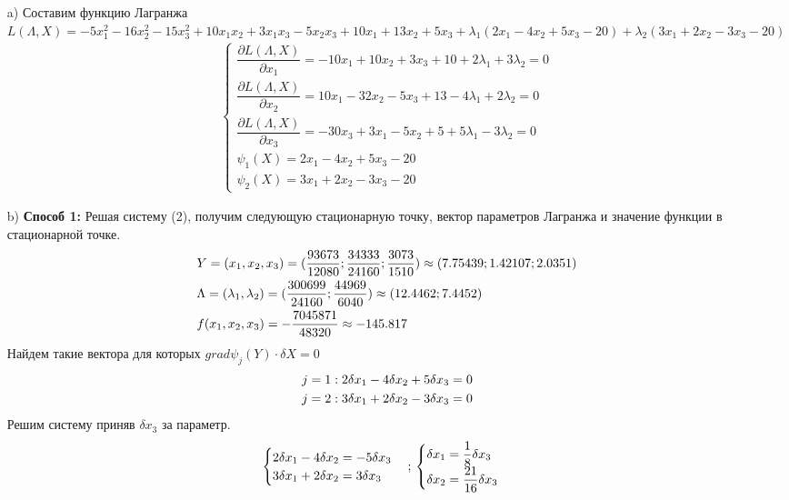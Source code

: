 \documentclass[12pt]{article}
\begin{document}
\begin{enumerate}
  \item[a)] Составим функцию Лагранжа
    $L(\Lambda, X)=-5x_1^2-16x_2^2-15x_3^2+10x_1x_2+3x_1x_3-5x_2x_3+10x_1+13x_2+5x_3+\lambda_1(2x_1-4x_2+5x_3-20)+
    \lambda_2(3x_1+2x_2-3x_3-20)$
  \begin{gather}
    \begin{cases}
        \dfrac{\partial L(\Lambda, X)}{\partial x_1}=-10x_1+10x_2+3x_3+10+2\lambda_1+3\lambda_2=0\\
        \dfrac{\partial L(\Lambda, X)}{\partial x_2}=10x_1-32x_2-5x_3+13-4\lambda_1+2\lambda_2=0\\
        \dfrac{\partial L(\Lambda, X)}{\partial x_3}=-30x_3+3x_1-5x_2+5+5\lambda_1-3\lambda_2=0\\
        \psi_1(X)=2x_1-4x_2+5x_3-20\\
        \psi_2(X)=3x_1+2x_2-3x_3-20
    \end{cases}
  \end{gather}
    \item[b)]
    \textbf{Способ 1:}
  Решая систему (2), получим следующую стационарную точку, вектор параметров Лагранжа и значение функции в стационарной точке.
\begin{align}
  &Y=(x_1,x_2,x_3)=(\frac{93673}{12080};\frac{34333}{24160};\frac{3073}{1510})\approx (7.75439;1.42107;2.0351)\notag\\
  &\Lambda=(\lambda_1,\lambda_2)=(\dfrac{300699}{24160};\dfrac{44969}{6040})\approx (12.4462;7.4452)\\
  &f(x_1,x_2,x_3)=-\dfrac{7045871}{48320}\approx -145.817\notag
\end{align}
Найдем такие вектора для которых $grad \psi_j(Y)\cdot \delta X=0$
\begin{align}
  &j=1:2\delta x_1-4\delta x_2+5\delta x_3=0\\
  &j=2:3\delta x_1+2\delta x_2-3\delta x_3=0\notag
\end{align}
Решим систему приняв $\delta x_3$ за параметр.
\begin{equation}
    \begin{cases}
      2\delta x_1-4\delta x_2=-5\delta x_3\\
      3\delta x_1+2\delta x_2=3\delta x_3
    \end{cases};\\
    \begin{cases}
      \delta x_1=\dfrac{1}{8}\delta x_3\\
      \delta x_2=\dfrac{21}{16}\delta x_3
    \end{cases}

\end{equation}
\end{enumerate}
\end{document}

